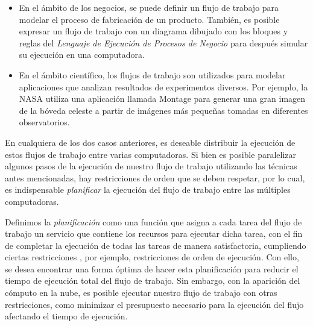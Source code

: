 \begin{itemize}
\item{En el ámbito de los negocios, se puede definir un flujo de trabajo para modelar el proceso de fabricación de un producto. También, es posible expresar un flujo de trabajo con un diagrama dibujado con los bloques y reglas del \emph{Lenguaje de Ejecución de Procesos de Negocio} para después simular su ejecución en una computadora.}

\item{En el ámbito científico, los flujos de trabajo son utilizados para modelar aplicaciones que analizan resultados de experimentos diversos. Por ejemplo, la NASA utiliza una aplicación llamada Montage para generar una gran imagen de la bóveda celeste a partir de imágenes más pequeñas tomadas en diferentes observatorios.}
\end{itemize}

En cualquiera de los dos casos anteriores, es deseable distribuir la ejecución de estos flujos de trabajo entre varias computadoras. Si bien es posible paralelizar algunos pasos de la ejecución de nuestro flujo de trabajo utilizando las técnicas antes mencionadas, hay restricciones de orden que se deben respetar, por lo cual, es indispensable \emph{planificar} la ejecución del flujo de trabajo entre las múltiples computadoras.

Definimos la \emph{planificación} como una función que asigna a cada tarea del flujo de trabajo un servicio que contiene los recursos para ejecutar dicha tarea, con el fin de completar la ejecución de todas las tareas de manera satisfactoria, cumpliendo ciertas restricciones \cite{wieczorek2009towards}, por ejemplo, restricciones de orden de ejecución. Con ello, se desea encontrar una forma óptima de hacer esta planificación para reducir el tiempo de ejecución total del flujo de trabajo. Sin embargo, con la aparición del cómputo en la nube, es posible ejecutar nuestro flujo de trabajo con otras restricciones, como minimizar el presupuesto necesario para la ejecución del flujo afectando el tiempo de ejecución.

